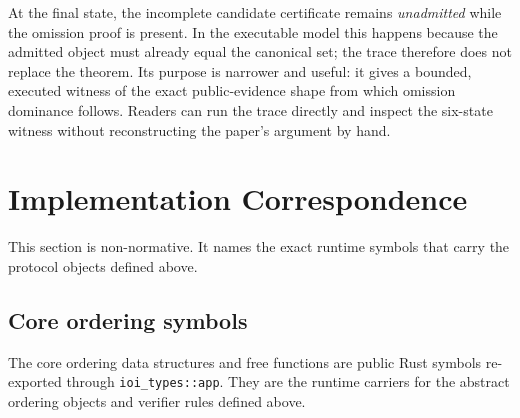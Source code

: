 \documentclass[11pt]{article}
\newcommand{\code}[1]{\texttt{#1}}
\begin{document}
At the final state, the incomplete candidate certificate remains
\emph{unadmitted} while the omission proof is present. In the executable
model this happens because the admitted object must already equal the canonical
set; the trace therefore does not replace the theorem. Its purpose is narrower
and useful: it gives a bounded, executed witness of the exact public-evidence
shape from which omission dominance follows. Readers can run the trace directly
and inspect the six-state witness without reconstructing the paper's argument by
hand.

\section{Implementation Correspondence}

This section is non-normative. It names the exact runtime symbols that carry
the protocol objects defined above.

\subsection{Core ordering symbols}

The core ordering data structures and free functions are public Rust symbols
re-exported through \code{ioi\_types::app}. They are the runtime carriers for
the abstract ordering objects and verifier rules defined above.
\end{document}
